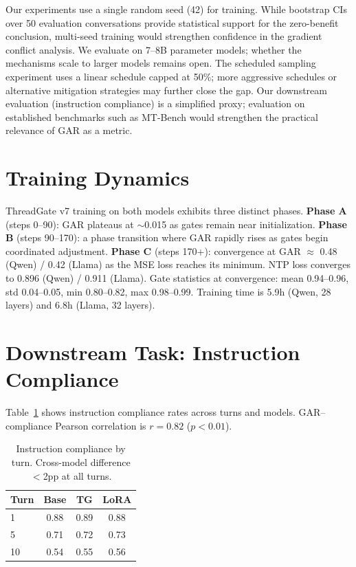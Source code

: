 \documentclass[11pt]{article}
\begin{document}
Our experiments use a single random seed (42) for training. While bootstrap CIs over 50 evaluation conversations provide statistical support for the zero-benefit conclusion, multi-seed training would strengthen confidence in the gradient conflict analysis. We evaluate on 7--8B parameter models; whether the mechanisms scale to larger models remains open. The scheduled sampling experiment uses a linear schedule capped at 50\%; more aggressive schedules or alternative mitigation strategies may further close the gap. Our downstream evaluation (instruction compliance) is a simplified proxy; evaluation on established benchmarks such as MT-Bench \citep{zheng2024judging} would strengthen the practical relevance of GAR as a metric.



\clearpage
\appendix

\section{Training Dynamics}
\label{sec:appendix-training}

ThreadGate v7 training on both models exhibits three distinct phases. \textbf{Phase A} (steps 0--90): GAR plateaus at $\sim$0.015 as gates remain near initialization. \textbf{Phase B} (steps 90--170): a phase transition where GAR rapidly rises as gates begin coordinated adjustment. \textbf{Phase C} (steps 170+): convergence at GAR $\approx$ 0.48 (Qwen) / 0.42 (Llama) as the MSE loss reaches its minimum. NTP loss converges to 0.896 (Qwen) / 0.911 (Llama). Gate statistics at convergence: mean 0.94--0.96, std 0.04--0.05, min 0.80--0.82, max 0.98--0.99. Training time is 5.9h (Qwen, 28 layers) and 6.8h (Llama, 32 layers).

\section{Downstream Task: Instruction Compliance}
\label{sec:appendix-downstream}

Table~\ref{tab:compliance} shows instruction compliance rates across turns and models. GAR--compliance Pearson correlation is $r = 0.82$ ($p < 0.01$).

\begin{table}[h]
\centering
\small
\begin{tabular}{lccc}
\toprule
\textbf{Turn} & \textbf{Base} & \textbf{TG} & \textbf{LoRA} \\
\midrule
1 & 0.88 & 0.89 & 0.88 \\
5 & 0.71 & 0.72 & 0.73 \\
10 & 0.54 & 0.55 & 0.56 \\
\bottomrule
\end{tabular}
\caption{Instruction compliance by turn. Cross-model difference $<$2pp at all turns.}
\label{tab:compliance}
\end{table}
\end{document}
